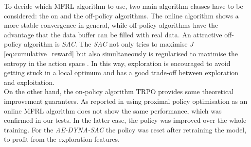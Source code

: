 \documentclass[
reprint,
amsmath,amssymb,amsfonts,clevref,
aps,
prstab,
]{revtex4-2}
\begin{document}
To decide which MFRL algorithm to use, two main algorithm classes have to be considered: the on and the off-policy algorithms. The online algorithm shows a more stable convergence in general, while off-policy algorithms have the advantage that the data buffer can be filled with real data. An attractive off-policy algorithm is \emph{SAC}. The \emph{SAC} not only tries to maximise $J$ \cref{eq:cumulative_reward} but also simultaneously is regularised to maximise the entropy in the action space \cite{Haarnoja2018a}. In this way, exploration is encouraged to avoid getting stuck in a local optimum and has a good trade-off between exploration and exploitation.\\
On the other hand, the on-policy algorithm TRPO \cite{Schulman2015} provides some theoretical improvement guarantees. As reported in \cite{Kurutach2018} using proximal policy optimisation \cite{Schulman2017} as an online MFRL algorithm does not show the same performance, which was confirmed in our tests. In the latter case, the policy was improved over the whole training. For the \emph{AE-DYNA-SAC} the policy was reset after retraining the model, to profit from the exploration features.
\end{document}
